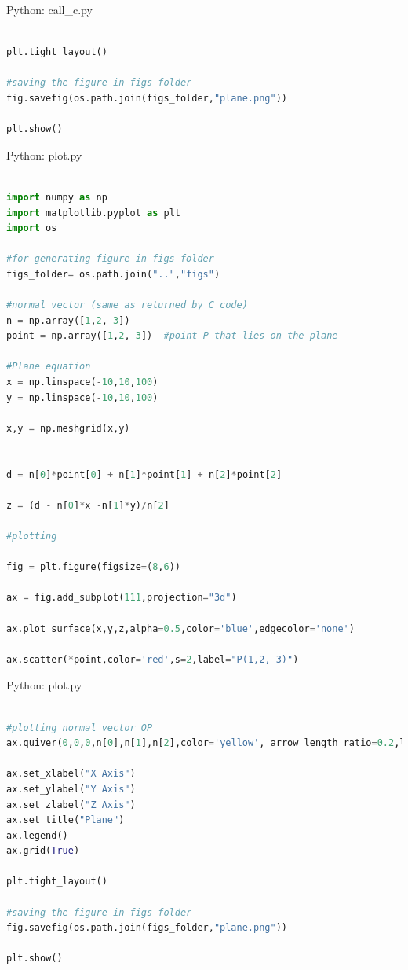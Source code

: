 \documentclass{beamer}
\numberwithin{equation}{section}
\theoremstyle{remark}
\begin{document}
\begin{frame}[fragile]{Python: call\_c.py}
\begin{lstlisting}[language=Python]

plt.tight_layout()

#saving the figure in figs folder
fig.savefig(os.path.join(figs_folder,"plane.png"))

plt.show()

\end{lstlisting}
\end{frame}

\begin{frame}[fragile]{Python: plot.py}
\begin{lstlisting}[language=Python]

import numpy as np
import matplotlib.pyplot as plt
import os

#for generating figure in figs folder
figs_folder= os.path.join("..","figs")

#normal vector (same as returned by C code)
n = np.array([1,2,-3])
point = np.array([1,2,-3])  #point P that lies on the plane

#Plane equation
x = np.linspace(-10,10,100)
y = np.linspace(-10,10,100)

x,y = np.meshgrid(x,y)


d = n[0]*point[0] + n[1]*point[1] + n[2]*point[2]

z = (d - n[0]*x -n[1]*y)/n[2]

#plotting

fig = plt.figure(figsize=(8,6))

ax = fig.add_subplot(111,projection="3d")

ax.plot_surface(x,y,z,alpha=0.5,color='blue',edgecolor='none')

ax.scatter(*point,color='red',s=2,label="P(1,2,-3)")

\end{lstlisting}
\end{frame}

\begin{frame}[fragile]{Python: plot.py}
\begin{lstlisting}[language=Python]

#plotting normal vector OP 
ax.quiver(0,0,0,n[0],n[1],n[2],color='yellow', arrow_length_ratio=0.2,label="Normal Vector")

ax.set_xlabel("X Axis")
ax.set_ylabel("Y Axis")
ax.set_zlabel("Z Axis")
ax.set_title("Plane")
ax.legend()
ax.grid(True)

plt.tight_layout()

#saving the figure in figs folder
fig.savefig(os.path.join(figs_folder,"plane.png"))

plt.show()

\end{lstlisting}
\end{frame}
\end{document}

